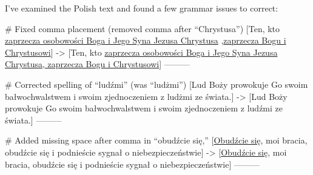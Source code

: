 I've examined the Polish text and found a few grammar issues to correct:

# Fixed comma placement (removed comma after “Chrystusa”)
[Ten, kto \underline{zaprzecza osobowości Boga i Jego Syna Jezusa Chrystusa} ,\underline{zaprzecza Bogu i Chrystusowi}]
->
[Ten, kto \underline{zaprzecza osobowości Boga i Jego Syna Jezusa Chrystusa}\underline{, zaprzecza Bogu i Chrystusowi}]
---------

# Corrected spelling of “ludźmi” (was “ludżmi”)
[Lud Boży prowokuje Go swoim bałwochwalstwem i swoim zjednoczeniem z ludżmi ze świata.]
->
[Lud Boży prowokuje Go swoim bałwochwalstwem i swoim zjednoczeniem z ludźmi ze świata.]
---------

# Added missing space after comma in “obudźcie się,”
[\underline{Obudźcie się}, moi bracia, obudźcie się i podnieście sygnał o niebezpieczeństwie]
->
[\underline{Obudźcie się}, moi bracia, obudźcie się i podnieście sygnał o niebezpieczeństwie]
---------